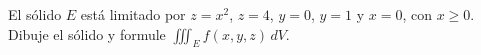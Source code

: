 El sólido $E$ está limitado por $z=x^2$, $z=4$, $y=0$, $y=1$ y $x=0$, con $x\geq0$. Dibuje el sólido y formule $\iiint_E f(x,y,z)\,dV$.
